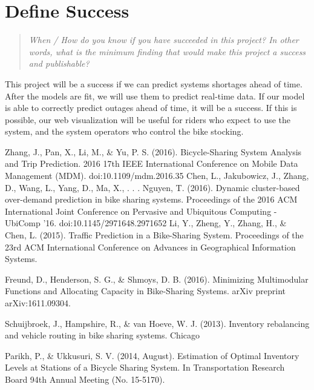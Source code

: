 \documentclass{proc}
\begin{document}
\section{Define Success}
\begin{quote}
\emph{When / How do you know if you have succeeded in this project?
In other words, what is the minimum finding that would make this project a success and publishable?}
\end{quote}


This project will be a success if we can predict systems shortages ahead of time. After the models are fit, we will use them to predict real-time data. If our model is able to correctly predict outages ahead of time, it will be a success. If this is possible, our web visualization will be useful for riders who expect to use the system, and the system operators who control the bike stocking.

\begin{thebibliography}{2}
  Zhang, J., Pan, X., Li, M., \& Yu, P. S. (2016). Bicycle-Sharing System Analysis and Trip Prediction. 2016 17th IEEE International Conference on Mobile Data Management (MDM). doi:10.1109/mdm.2016.35
Chen, L., Jakubowicz, J., Zhang, D., Wang, L., Yang, D., Ma, X., . . . Nguyen, T. (2016). Dynamic cluster-based over-demand prediction in bike sharing systems. Proceedings of the 2016 ACM International Joint Conference on Pervasive and Ubiquitous Computing - UbiComp '16. doi:10.1145/2971648.2971652
 Li, Y., Zheng, Y., Zhang, H., \& Chen, L. (2015). Traffic Prediction in a Bike-Sharing System. Proceedings of the 23rd ACM International Conference on Advances in Geographical Information Systems.

 Freund, D., Henderson, S. G., \& Shmoys, D. B. (2016). Minimizing Multimodular Functions and Allocating Capacity in Bike-Sharing Systems. arXiv preprint arXiv:1611.09304.

Schuijbroek, J., Hampshire, R., \& van Hoeve, W. J. (2013). Inventory rebalancing and vehicle routing in bike sharing systems.
Chicago	

 Parikh, P., \& Ukkusuri, S. V. (2014, August). Estimation of Optimal Inventory Levels at Stations of a Bicycle Sharing System. In Transportation Research Board 94th Annual Meeting (No. 15-5170).


\end{thebibliography}


\end{document}
